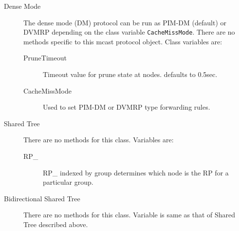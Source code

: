 \begin{flushleft}
\begin{description}
\item[Dense Mode]
The dense mode (DM) protocol can be run as PIM-DM (default) or DVMRP
depending on the class variable {\tt CacheMissMode}. There are no methods
specific to this mcast protocol object. Class variables are:
 \begin{description}
   \item[PruneTimeout] Timeout value for prune state at nodes. defaults to
0.5sec.
   \item[CacheMissMode] Used to set PIM-DM or DVMRP type forwarding rules.
 \end{description}


\item[Shared Tree]
There are no methods for this class. Variables are:
\begin{description}
\item[RP\_] RP\_ indexed by group determines which node is the RP for a
particular group.
\end{description}


\item[Bidirectional Shared Tree]
There are no methods for this class. Variable is same as that of Shared
Tree described above.

\end{description}

\end{flushleft}

\endinput
